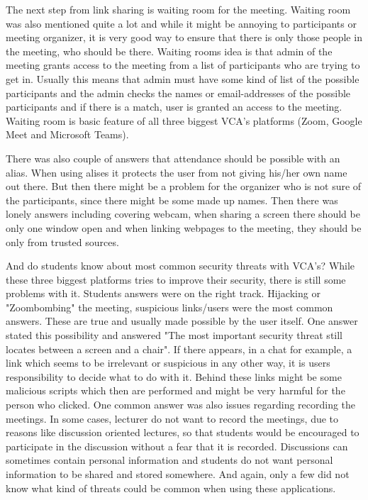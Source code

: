 \documentclass[utf8,english]{gradu3}
\begin{document}
The next step from link sharing is waiting room for the meeting. Waiting room was also mentioned quite a lot and while it might be annoying to participants or meeting organizer, it is very good way to ensure that there is only those people in the meeting, who should be there. Waiting rooms idea is that admin of the meeting grants access to the meeting from a list of participants who are trying to get in. Usually this means that admin must have some kind of list of the possible participants and the admin checks the names or email-addresses of the possible participants and if there is a match, user is granted an access to the meeting. Waiting room is basic feature of all three biggest VCA's platforms (Zoom, Google Meet and Microsoft Teams).

There was also couple of answers that attendance should be possible with an alias. When using alises it protects the user from not giving his/her own name out there. But then there might be a problem for the organizer who is not sure of the participants, since there might be some made up names. Then there was lonely answers including covering webcam, when sharing a screen there should be only one window open and when linking webpages to the meeting, they should be only from trusted sources.

And do students know about most common security threats with VCA's? While these three biggest platforms tries to improve their security, there is still some problems with it. Students answers were on the right track. Hijacking or "Zoombombing" the meeting, suspicious links/users were the most common answers. These are true and usually made possible by the user itself. One answer stated this possibility and answered "The most important security threat still locates between a screen and a chair". If there appears, in a chat for example, a link which seems to be irrelevant or suspicious in any other way, it is users responsibility to decide what to do with it. Behind these links might be some malicious scripts which then are performed and might be very harmful for the person who clicked. One common answer was also issues regarding recording the meetings. In some cases, lecturer do not want to record the meetings, due to reasons like discussion oriented lectures, so that students would be encouraged to participate in the discussion without a fear that it is recorded. Discussions can sometimes contain personal information and students do not want personal information to be shared and stored somewhere. And again, only a few did not know what kind of threats could be common when using these applications. 
\end{document}
